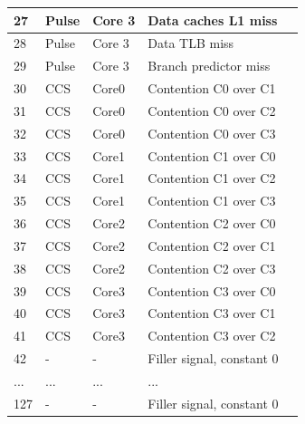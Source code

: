 \begin{table}[H]
\begin{footnotesize}
\begin{tabular}{|l|l|l|l|l|}
\hline 
27 & Pulse & Core 3 &  Data caches L1 miss \\
\hline 
28 & Pulse & Core 3 &  Data TLB miss \\
\hline 
29 & Pulse & Core 3 &  Branch predictor miss \\
\hline 
30 & CCS & Core0 &  Contention C0 over C1\\
\hline 
31 & CCS & Core0 &  Contention C0 over C2\\
\hline 
32 & CCS & Core0 &  Contention C0 over C3\\
\hline 
33 & CCS & Core1 &  Contention C1 over C0\\
\hline 
34 & CCS & Core1 &  Contention C1 over C2\\
\hline 
35 & CCS & Core1 &  Contention C1 over C3\\
\hline 
36 & CCS & Core2 &  Contention C2 over C0\\
\hline 
37 & CCS & Core2 &  Contention C2 over C1\\
\hline 
38 & CCS & Core2 &  Contention C2 over C3\\
\hline 
39 & CCS & Core3 &  Contention C3 over C0\\
\hline 
40 & CCS & Core3 &  Contention C3 over C1\\
\hline 
41 & CCS & Core3 &  Contention C3 over C2\\
\hline 
42 & - & - &   Filler signal, constant 0 \\
\hline 
... & ... & ... &  ... \\

\hline 
127 & - & - &   Filler signal, constant 0 \\
\hline 
	\end{tabular}
	\end{footnotesize}
\end{table}

